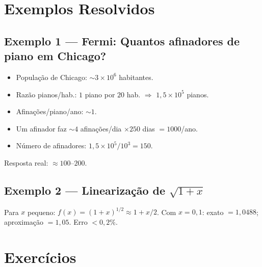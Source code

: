 \documentclass[12pt,a4paper]{article}
\begin{document}
\section*{Exemplos Resolvidos}

\subsection*{Exemplo 1 --- Fermi: Quantos afinadores de piano em Chicago?}
\begin{itemize}
  \item Popula\c{c}\~ao de Chicago: $\sim3 \times 10^6$ habitantes.
  \item Raz\~ao pianos/hab.: $1$ piano por $20$ hab. $\Rightarrow$ $1{,}5 \times 10^5$ pianos.
  \item Afina\c{c}\~oes/piano/ano: $\sim 1$.
  \item Um afinador faz $\sim 4$ afina\c{c}\~oes/dia $\times 250$ dias $= 1000$/ano.
  \item N\'umero de afinadores: $1{,}5 \times 10^5 / 10^3 = 150$.
\end{itemize}
Resposta real: $\approx 100$--$200$.

\subsection*{Exemplo 2 --- Lineariza\c{c}\~ao de $\sqrt{1+x}$}
Para $x$ pequeno: $f(x) = (1+x)^{1/2} \approx 1 + x/2$.
Com $x=0{,}1$: exato $= 1{,}0488$; aproxima\c{c}\~ao $= 1{,}05$. Erro $< 0{,}2\%$.

\section*{Exerc\'icios}
\end{document}
